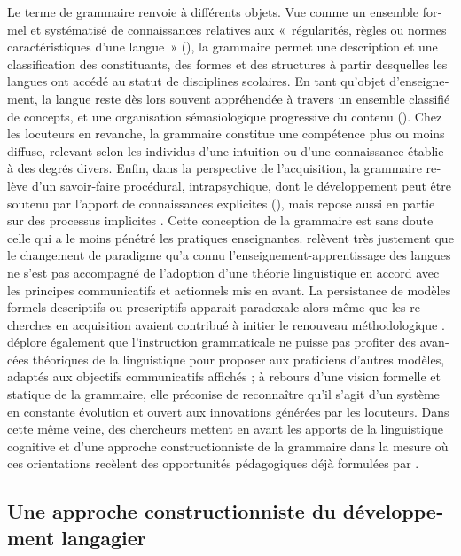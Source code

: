\documentclass[output=paper]{langscibook}
\begin{document}
\begin{otherlanguage}{french}
Le terme de grammaire renvoie à différents objets. Vue comme un ensemble formel et systématisé de connaissances relatives aux «~régularités, règles ou normes caractéristiques d’une langue~» (\citealt[10]{BessePorquier1991}), la grammaire permet une description et une classification des constituants, des formes et des structures à partir desquelles les langues ont accédé au statut de disciplines scolaires. En tant qu’objet d’enseignement, la langue reste dès lors souvent appréhendée à travers un ensemble classifié de concepts, et une organisation sémasiologique progressive du contenu (\citealt[2]{Véronique2005Interrelations}). Chez les locuteurs en revanche, la grammaire constitue une compétence plus ou moins diffuse, relevant selon les individus d’une intuition ou d’une connaissance établie à des degrés divers. Enfin, dans la perspective de l’acquisition, la grammaire relève d’un savoir-faire procédural, intrapsychique, dont le développement peut être soutenu par l’apport de connaissances explicites (\citealt{NorrisOrtega2000}), mais repose aussi en partie sur des processus implicites \citep{Véronique2019}. Cette conception de la grammaire est sans doute celle qui a le moins pénétré les pratiques enseignantes. \citet[4--5]{TylerOrtega2018} relèvent très justement que le changement de paradigme qu’a connu l’enseignement-apprentissage des langues ne s’est pas accompagné de l’adoption d’une théorie linguistique en accord avec les principes communicatifs et actionnels mis en avant. La persistance de modèles formels descriptifs ou prescriptifs apparait paradoxale alors même que les recherches en acquisition avaient contribué à initier le renouveau méthodologique \citep{Véronique2005Interrelations}. \citet{Larsen-Freeman2015} déplore également que l’instruction grammaticale ne puisse pas profiter des avancées théoriques de la linguistique pour proposer aux praticiens d’autres modèles, adaptés aux objectifs communicatifs affichés ; à rebours d’une vision formelle et statique de la grammaire, elle préconise de reconnaître qu’il s’agit d’un système en constante évolution et ouvert aux innovations générées par les locuteurs. Dans cette même veine, des chercheurs \parencites[194]{Achard2021}[]{Schmale2021} mettent en avant les apports de la linguistique cognitive et d’une approche constructionniste de la grammaire dans la mesure où ces orientations recèlent des opportunités pédagogiques déjà formulées par \citet{Langacker2008b}.

\subsection{Une approche constructionniste du développement langagier}\label{sec:felce:4.2}\largerpage


\end{otherlanguage}
\end{document}
